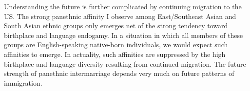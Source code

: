\documentclass[11pt,]{article}
\begin{document}
Understanding the future is further complicated by continuing migration to the US. The strong panethnic affinity I observe among East/Southeast Asian and South Asian ethnic groups only emerges net of the strong tendency toward birthplace and language endogamy. In a situation in which all members of these groups are English-speaking native-born individuals, we would expect such affinities to emerge. In actuality, such affinities are suppressed by the high birthplace and language diversity resulting from continued migration. The future strength of panethnic intermarriage depends very much on future patterns of immigration.



\renewcommand\refname{References}

\end{document}
